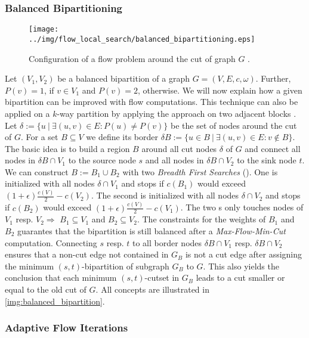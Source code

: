 \subsubsection{Balanced Bipartitioning}
\label{sec:balanced_bipartitioning}
\begin{figure}
\centering
\texttt{[image: ../img/flow\_local\_search/balanced\_bipartitioning.eps]}
\caption{Configuration of a flow problem around the cut of graph $G$ \cite{andersen2008algorithm}.}
\label{img:balanced_bipartition}
\end{figure}
Let $(V_1,V_2)$ be a balanced bipartition of a graph $G = (V,E,c,\omega)$. 
Further, $P(v) = 1$, if $v \in V_1$ and
$P(v) = 2$, otherwise. We will now explain how a given bipartition 
can be improved with flow computations. This technique can also be applied on a $k$-way 
partition by applying the approach on two adjacent blocks \cite{sanders2011engineering}. \\
Let $\delta := \{ u\ |\ \exists (u,v) \in E: P(u) \neq P(v) \}$ be the set of nodes
around the cut of $G$. For a set $B \subseteq V$ we define its border 
$\delta B := \{u \in B\ |\ \exists (u,v) \in E: v \notin B\}$.
The basic idea is to build a region $B$ around all cut nodes $\delta$ of 
$G$ and connect all nodes in $\delta B \cap V_1$ to the source node $s$ and all nodes in 
$\delta B \cap V_2$ to the sink node $t$. \\
We can construct $B := B_1 \cup B_2$ with two \emph{Breadth First Searches} (\BFS). 
One is initialized with all nodes $\delta \cap V_1$ and stops if $c(B_1)$ would 
exceed $(1+\epsilon)\frac{c(V)}{2} - c(V_2)$. The second is initialized with 
all nodes $\delta \cap V_2$ and stops if $c(B_2)$ would exceed 
$(1+\epsilon)\frac{c(V)}{2} - c(V_1)$. The two \BFS s only touches nodes of $V_1$ resp. $V_2 \Rightarrow$
$B_1 \subseteq V_1$ and $B_2 \subseteq V_2$. The constraints for the weights of $B_1$
and $B_2$ guarantes that the bipartition is still balanced after a \emph{Max-Flow-Min-Cut}
computation. Connecting $s$ resp. $t$ to all border nodes $\delta B \cap V_1$ resp.
$\delta B \cap V_2$ ensures that a non-cut edge not contained in $G_B$ is not a cut edge after
assigning the minimum $(s,t)$-bipartition of subgraph $G_B$ to $G$. This also yields 
the conclusion that each minimum $(s,t)$-cutset in $G_B$ leads to a cut smaller or 
equal to the old cut of $G$. All concepts are illustrated in \autoref{img:balanced_bipartition}.


\subsubsection{Adaptive Flow Iterations}
\label{sec:adaptive_flow_iterations}

